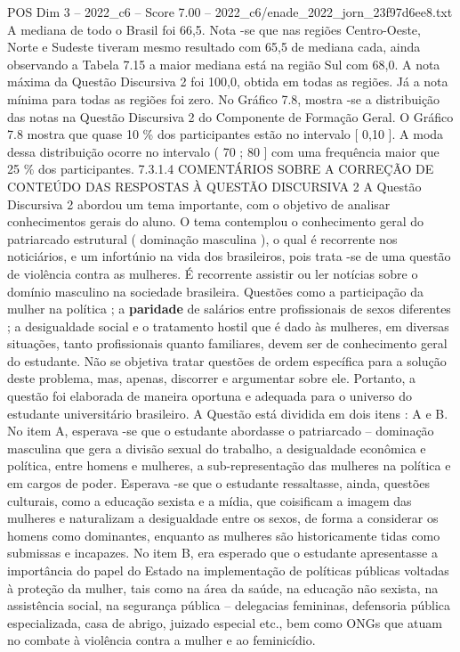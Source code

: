 \begin{textsample}{POS Dim 3 – 2022\_c6 – Score 7.00 – 2022\_c6/enade\_2022\_jorn\_23f97d6ee8.txt}
A mediana de todo o Brasil foi 66,5.
Nota -se que nas regiões Centro-Oeste, Norte e Sudeste tiveram mesmo resultado com 65,5 de mediana cada, ainda observando a Tabela 7.15 a maior mediana está na região Sul com 68,0.
A nota máxima da Questão Discursiva 2 foi 100,0, obtida em todas as regiões.
Já a nota mínima para todas as regiões foi zero.
No Gráfico 7.8, mostra -se a distribuição das notas na Questão Discursiva 2 do Componente de Formação Geral.
O Gráfico 7.8 mostra que quase 10 \% dos participantes estão no intervalo [ 0,10 ].
A moda dessa distribuição ocorre no intervalo ( 70 ; 80 ] com uma frequência maior que 25 \% dos participantes. 7.3.1.4 COMENTÁRIOS SOBRE A CORREÇÃO DE CONTEÚDO DAS RESPOSTAS À QUESTÃO DISCURSIVA 2 A Questão Discursiva 2 abordou um tema importante, com o objetivo de analisar conhecimentos gerais do aluno.
O tema contemplou o conhecimento geral do patriarcado estrutural ( dominação masculina ), o qual é recorrente nos noticiários, e um infortúnio na vida dos brasileiros, pois trata -se de uma questão de violência contra as mulheres.
É recorrente assistir ou ler notícias sobre o domínio masculino na sociedade brasileira.
Questões como a participação da mulher na política ; a \textbf{paridade} de salários entre profissionais de sexos diferentes ; a desigualdade social e o tratamento hostil que é dado às mulheres, em diversas situações, tanto profissionais quanto familiares, devem ser de conhecimento geral do estudante.
Não se objetiva tratar questões de ordem específica para a solução deste problema, mas, apenas, discorrer e argumentar sobre ele.
Portanto, a questão foi elaborada de maneira oportuna e adequada para o universo do estudante universitário brasileiro.
A Questão está dividida em dois itens : A e B.
No item A, esperava -se que o estudante abordasse o patriarcado – dominação masculina que gera a divisão sexual do trabalho, a desigualdade econômica e política, entre homens e mulheres, a sub-representação das mulheres na política e em cargos de poder.
Esperava -se que o estudante ressaltasse, ainda, questões culturais, como a educação sexista e a mídia, que coisificam a imagem das mulheres e naturalizam a desigualdade entre os sexos, de forma a considerar os homens como dominantes, enquanto as mulheres são historicamente tidas como submissas e incapazes.
No item B, era esperado que o estudante apresentasse a importância do papel do Estado na implementação de políticas públicas voltadas à proteção da mulher, tais como na área da saúde, na educação não sexista, na assistência social, na segurança pública – delegacias femininas, defensoria pública especializada, casa de abrigo, juizado especial etc., bem como ONGs que atuam no combate à violência contra a mulher e ao feminicídio.

\end{textsample}
